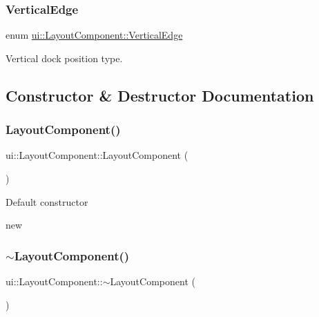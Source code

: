 \subsubsection{\texorpdfstring{Vertical\+Edge}{VerticalEdge}\hspace{0.1cm}{\footnotesize\ttfamily [2/2]}}
{\footnotesize\ttfamily enum \hyperlink{classui_1_1LayoutComponent_a186978dac32f26bf251942e893999c8f}{ui\+::\+Layout\+Component\+::\+Vertical\+Edge}\hspace{0.3cm}{\ttfamily [strong]}}

Vertical dock position type. 

\subsection{Constructor \& Destructor Documentation}
\mbox{\label{classui_1_1LayoutComponent_ab67f1d89a3f62b9acd30506ef6635cba}} 
\subsubsection{\texorpdfstring{Layout\+Component()}{LayoutComponent()}\hspace{0.1cm}{\footnotesize\ttfamily [1/2]}}
{\footnotesize\ttfamily ui\+::\+Layout\+Component\+::\+Layout\+Component (\begin{DoxyParamCaption}{ }\end{DoxyParamCaption})}

Default constructor

new \mbox{\label{classui_1_1LayoutComponent_a6e3325f4c64c5c7e48900b03e706ecac}} 
\subsubsection{\texorpdfstring{$\sim$\+Layout\+Component()}{~LayoutComponent()}\hspace{0.1cm}{\footnotesize\ttfamily [1/2]}}
{\footnotesize\ttfamily ui\+::\+Layout\+Component\+::$\sim$\+Layout\+Component (\begin{DoxyParamCaption}{ }\end{DoxyParamCaption})}

